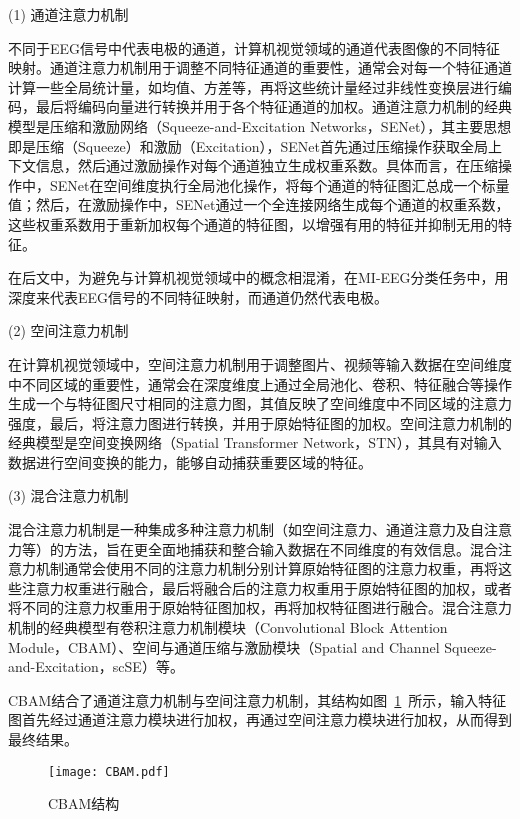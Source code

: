 (1) 通道注意力机制
    
不同于EEG信号中代表电极的通道，计算机视觉领域的通道代表图像的不同特征映射。通道注意力机制用于调整不同特征通道的重要性，通常会对每一个特征通道计算一些全局统计量，如均值、方差等，再将这些统计量经过非线性变换层进行编码，最后将编码向量进行转换并用于各个特征通道的加权。通道注意力机制的经典模型是压缩和激励网络（Squeeze-and-Excitation Networks，SENet）\cite{8578843}，其主要思想即是压缩（Squeeze）和激励（Excitation），SENet首先通过压缩操作获取全局上下文信息，然后通过激励操作对每个通道独立生成权重系数。具体而言，在压缩操作中，SENet在空间维度执行全局池化操作，将每个通道的特征图汇总成一个标量值；然后，在激励操作中，SENet通过一个全连接网络生成每个通道的权重系数，这些权重系数用于重新加权每个通道的特征图，以增强有用的特征并抑制无用的特征。

在后文中，为避免与计算机视觉领域中的概念相混淆，在MI-EEG分类任务中，用深度来代表EEG信号的不同特征映射，而通道仍然代表电极。

(2) 空间注意力机制
    
在计算机视觉领域中，空间注意力机制用于调整图片、视频等输入数据在空间维度中不同区域的重要性，通常会在深度维度上通过全局池化、卷积、特征融合等操作生成一个与特征图尺寸相同的注意力图，其值反映了空间维度中不同区域的注意力强度，最后，将注意力图进行转换，并用于原始特征图的加权。空间注意力机制的经典模型是空间变换网络（Spatial Transformer Network，STN）\cite{jaderberg2015spatial}，其具有对输入数据进行空间变换的能力，能够自动捕获重要区域的特征。

(3) 混合注意力机制
    
混合注意力机制是一种集成多种注意力机制（如空间注意力、通道注意力及自注意力等）的方法，旨在更全面地捕获和整合输入数据在不同维度的有效信息。混合注意力机制通常会使用不同的注意力机制分别计算原始特征图的注意力权重，再将这些注意力权重进行融合，最后将融合后的注意力权重用于原始特征图的加权，或者将不同的注意力权重用于原始特征图加权，再将加权特征图进行融合。混合注意力机制的经典模型有卷积注意力机制模块（Convolutional Block Attention Module，CBAM）\cite{woo2018cbam}、空间与通道压缩与激励模块（Spatial and Channel Squeeze-and-Excitation，scSE）\cite{roy2018concurrent}等。
    
CBAM结合了通道注意力机制与空间注意力机制，其结构如图~\ref{fig:CBAM}~所示，输入特征图首先经过通道注意力模块进行加权，再通过空间注意力模块进行加权，从而得到最终结果。
\begin{figure}
    \centering
    \texttt{[image: CBAM.pdf]}
    \caption{CBAM结构}
    \label{fig:CBAM}
\end{figure}

